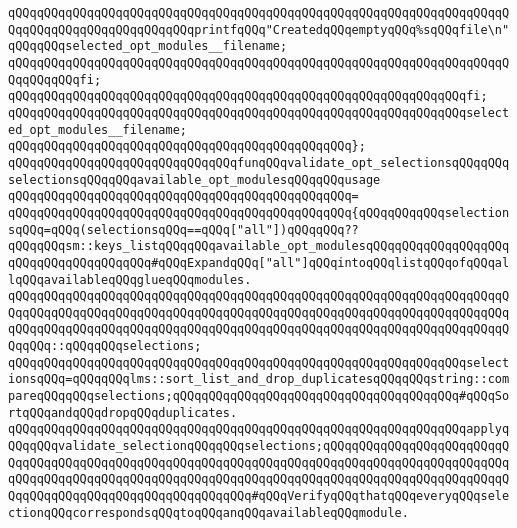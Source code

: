 \verb|qQQqqQQqqQQqqQQqqQQqqQQqqQQqqQQqqQQqqQQqqQQqqQQqqQQqqQQqqQQqqQQqqQQqqQQqqQQqqQQqqQQqqQQqqQQqqQQqprintfqQQq"CreatedqQQqemptyqQQq%sqQQqfile\n"qQQqqQQqselected_opt_modules__filename;|\newline
\verb|qQQqqQQqqQQqqQQqqQQqqQQqqQQqqQQqqQQqqQQqqQQqqQQqqQQqqQQqqQQqqQQqqQQqqQQqqQQqqQQqfi;|\newline
\verb|qQQqqQQqqQQqqQQqqQQqqQQqqQQqqQQqqQQqqQQqqQQqqQQqqQQqqQQqqQQqqQQqfi;|\newline
\newline
\verb|qQQqqQQqqQQqqQQqqQQqqQQqqQQqqQQqqQQqqQQqqQQqqQQqqQQqqQQqqQQqqQQqselected_opt_modules__filename;|\newline
\verb|qQQqqQQqqQQqqQQqqQQqqQQqqQQqqQQqqQQqqQQqqQQqqQQq};|\newline
\newline
\newline
\newline
\verb|qQQqqQQqqQQqqQQqqQQqqQQqqQQqqQQqfunqQQqvalidate_opt_selectionsqQQqqQQqselectionsqQQqqQQqavailable_opt_modulesqQQqqQQqusage|\newline
\verb|qQQqqQQqqQQqqQQqqQQqqQQqqQQqqQQqqQQqqQQqqQQqqQQq=|\newline
\verb|qQQqqQQqqQQqqQQqqQQqqQQqqQQqqQQqqQQqqQQqqQQqqQQq{qQQqqQQqqQQqselectionsqQQq=qQQq(selectionsqQQq==qQQq["all"])qQQqqQQq??qQQqqQQqsm::keys_listqQQqqQQqavailable_opt_modulesqQQqqQQqqQQqqQQqqQQqqQQqqQQqqQQqqQQqqQQq#qQQqExpandqQQq["all"]qQQqintoqQQqlistqQQqofqQQqallqQQqavailableqQQqglueqQQqmodules.|\newline
\verb|qQQqqQQqqQQqqQQqqQQqqQQqqQQqqQQqqQQqqQQqqQQqqQQqqQQqqQQqqQQqqQQqqQQqqQQqqQQqqQQqqQQqqQQqqQQqqQQqqQQqqQQqqQQqqQQqqQQqqQQqqQQqqQQqqQQqqQQqqQQqqQQqqQQqqQQqqQQqqQQqqQQqqQQqqQQqqQQqqQQqqQQqqQQqqQQqqQQqqQQqqQQqqQQqqQQqqQQq::qQQqqQQqselections;|\newline
\newline
\verb|qQQqqQQqqQQqqQQqqQQqqQQqqQQqqQQqqQQqqQQqqQQqqQQqqQQqqQQqqQQqqQQqselectionsqQQq=qQQqqQQqlms::sort_list_and_drop_duplicatesqQQqqQQqstring::compareqQQqqQQqselections;qQQqqQQqqQQqqQQqqQQqqQQqqQQqqQQqqQQqqQQq#qQQqSortqQQqandqQQqdropqQQqduplicates.|\newline
\newline
\verb|qQQqqQQqqQQqqQQqqQQqqQQqqQQqqQQqqQQqqQQqqQQqqQQqqQQqqQQqqQQqqQQqapplyqQQqqQQqvalidate_selectionqQQqqQQqselections;qQQqqQQqqQQqqQQqqQQqqQQqqQQqqQQqqQQqqQQqqQQqqQQqqQQqqQQqqQQqqQQqqQQqqQQqqQQqqQQqqQQqqQQqqQQqqQQqqQQqqQQqqQQqqQQqqQQqqQQqqQQqqQQqqQQqqQQqqQQqqQQqqQQqqQQqqQQqqQQqqQQqqQQqqQQqqQQqqQQqqQQqqQQqqQQqqQQqqQQq#qQQqVerifyqQQqthatqQQqeveryqQQqselectionqQQqcorrespondsqQQqtoqQQqanqQQqavailableqQQqmodule.|\newline
